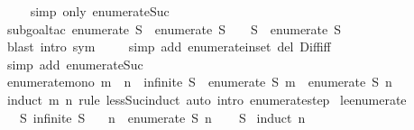 \begin{isabellebody}
\ \ \ \isamarkupfalse%
\ {\isacharparenleft}simp\ only{\isacharcolon}\ enumerate{\isacharunderscore}Suc{\isacharprime}{\isacharparenright}\isanewline
\ \ \ \isamarkupfalse%
\ {\isacharparenleft}subgoal{\isacharunderscore}tac\ {\isachardoublequoteopen}enumerate\ {\isacharparenleft}S\ {\isacharminus}\ {\isacharbraceleft}enumerate\ S\ {}{\isacharbraceright}{\isacharparenright}\ {}\ {\isasymin}\ S\ {\isacharminus}\ {\isacharbraceleft}enumerate\ S\ {}{\isacharbraceright}{\isachardoublequoteclose}{\isacharparenright}\isanewline
\ \ \ \ \isamarkupfalse%
\ {\isacharparenleft}blast\ intro{\isacharcolon}\ sym{\isacharparenright}\isanewline
\ \ \ \isamarkupfalse%
\ {\isacharparenleft}simp\ add{\isacharcolon}\ enumerate{\isacharunderscore}in{\isacharunderscore}set\ del{\isacharcolon}\ Diff{\isacharunderscore}iff{\isacharparenright}\isanewline
\ \ \isamarkupfalse%
\ {\isacharparenleft}simp\ add{\isacharcolon}\ enumerate{\isacharunderscore}Suc{\isacharprime}{\isacharparenright}\isanewline
\ \ \isamarkupfalse%
%
\endisatagproof
{\isafoldproof}%
%
\isadelimproof
\isanewline
%
\endisadelimproof
\isanewline
{}\isamarkupfalse%
\ enumerate{\isacharunderscore}mono{\isacharcolon}\ {\isachardoublequoteopen}m\ {\isacharless}\ n\ {\isasymLongrightarrow}\ infinite\ S\ {\isasymLongrightarrow}\ enumerate\ S\ m\ {\isacharless}\ enumerate\ S\ n{\isachardoublequoteclose}\isanewline
%
\isadelimproof
\ \ %
\endisadelimproof
%
\isatagproof
{}\isamarkupfalse%
\ {\isacharparenleft}induct\ m\ n\ rule{\isacharcolon}\ less{\isacharunderscore}Suc{\isacharunderscore}induct{\isacharparenright}\ {\isacharparenleft}auto\ intro{\isacharcolon}\ enumerate{\isacharunderscore}step{\isacharparenright}%
\endisatagproof
{\isafoldproof}%
%
\isadelimproof
\isanewline
%
\endisadelimproof
\isanewline
{}\isamarkupfalse%
\ le{\isacharunderscore}enumerate{\isacharcolon}\isanewline
\ \ \ S{\isacharcolon}\ {\isachardoublequoteopen}infinite\ S{\isachardoublequoteclose}\isanewline
\ \ \ {\isachardoublequoteopen}n\ {\isasymle}\ enumerate\ S\ n{\isachardoublequoteclose}\isanewline
%
\isadelimproof
\ \ %
\endisadelimproof
%
\isatagproof
{}\isamarkupfalse%
\ S\isanewline
{}\isamarkupfalse%
\ {\isacharparenleft}induct\ n{\isacharparenright}\isanewline
\ \ \isamarkupfalse%
\ {}\isanewline
\ \ \isamarkupfalse%
\ \isamarkupfalse%

\end{isabellebody}
